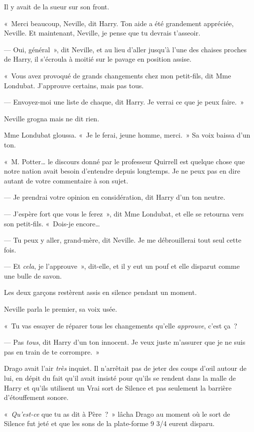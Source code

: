 Il y avait de la sueur sur son front.

«~Merci beaucoup, Neville, dit Harry.
Ton aide a été grandement appréciée, Neville.
Et maintenant, Neville, je pense que tu devrais t'asseoir.

--- Oui, général~», dit Neville, et au lieu d'aller jusqu'à l'une des chaises proches de Harry, il s'écroula à moitié sur le pavage en position assise.

«~Vous avez provoqué de grands changements chez mon petit-fils, dit Mme Londubat.
J'approuve certains, mais pas tous.

--- Envoyez-moi une liste de chaque, dit Harry.
Je verrai ce que je peux faire.~»

Neville grogna mais ne dit rien.

Mme Londubat gloussa.
«~Je le ferai, jeune homme, merci.~»
Sa voix baissa d'un ton.

«~M. Potter… le discours donné par le professeur Quirrell est quelque chose que notre nation avait besoin d'entendre depuis longtemps.
Je ne peux pas en dire autant de votre commentaire à son sujet.

--- Je prendrai votre opinion en considération, dit Harry d'un ton neutre.

--- J'espère fort que vous le ferez~», dit Mme Londubat, et elle se retourna vers son petit-fils.
«~Dois-je encore…

--- Tu peux y aller, grand-mère, dit Neville.
Je me débrouillerai tout seul cette fois.

--- Et \emph{cela}, je l'approuve~», dit-elle, et il y eut un pouf et elle disparut comme une bulle de savon.

Les deux garçons restèrent assis en silence pendant un moment.

Neville parla le premier, sa voix usée.

«~Tu vas essayer de réparer tous les changements qu'elle \emph{approuve}, c'est ça~?

--- Pas \emph{tous}, dit Harry d'un ton innocent.
Je veux juste m'assurer que je ne suis pas en train de te corrompre.~»

\later

Drago avait l'air \emph{très} inquiet.
Il n'arrêtait pas de jeter des coups d'œil autour de lui, en dépit du fait qu'il avait insisté pour qu'ils se rendent dans la malle de Harry et qu'ils utilisent un Vrai sort de Silence et pas seulement la barrière d'étouffement sonore.

«~\emph{Qu'est-ce} que tu as dit à Père~?~»
lâcha Drago au moment où le sort de Silence fut jeté et que les sons de la plate-forme 9 3/4 eurent disparu.

